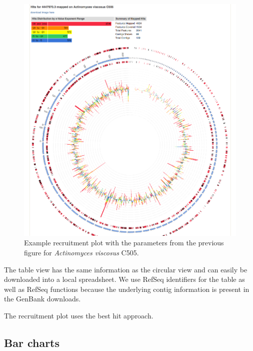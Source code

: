 \documentclass[12pt,fullpage]{report}
\begin{document}
\begin{figure}
\begin{center}
\includegraphics[width=6in]{Images/analysis-page-recruitment-plot-example.png}
\end{center}
\caption{
Example recruitment plot with the parameters from the previous figure for \textit{Actinomyces viscosus} C505.
}
\label{fig:analysis-page-recruitment-plot-example}
\end{figure}

The table view has the same information as the circular view and can easily be downloaded into a local spreadsheet. We use RefSeq\cite{REFSEQ} identifiers for the table as well as RefSeq functions because the underlying contig information is present in the GenBank\cite{GENBANK} downloads.

The recruitment plot uses the best hit approach.
\subsection{Bar charts}
\label{section:bar-charts}
\end{document}

